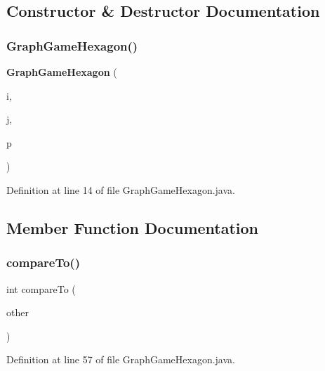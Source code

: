 \subsection{Constructor \& Destructor Documentation}
\mbox{\label{classru_1_1litun_1_1unitingtwist_1_1_graph_game_hexagon_ad1b7b0e1b716c94a50547786a7ea073a}} 
\subsubsection{Graph\+Game\+Hexagon()}
{\footnotesize\ttfamily \textbf{ Graph\+Game\+Hexagon} (\begin{DoxyParamCaption}\item[{int}]{i,  }\item[{int}]{j,  }\item[{Point}]{p }\end{DoxyParamCaption})}



Definition at line 14 of file Graph\+Game\+Hexagon.\+java.



\subsection{Member Function Documentation}
\mbox{\label{classru_1_1litun_1_1unitingtwist_1_1_graph_game_hexagon_a2dc80c265fbf063674dc3920f818ce30}} 
\subsubsection{compare\+To()}
{\footnotesize\ttfamily int compare\+To (\begin{DoxyParamCaption}\item[{@Non\+Null \textbf{ Graph\+Game\+Hexagon}}]{other }\end{DoxyParamCaption})}



Definition at line 57 of file Graph\+Game\+Hexagon.\+java.

